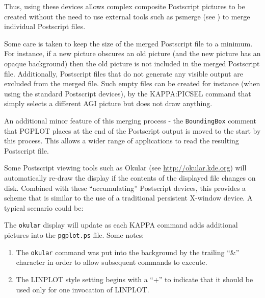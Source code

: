 \documentclass[twoside,11pt]{starlink}
\begin{document}
Thus, using these devices allows complex composite Postscript pictures to
be created without the need to use external tools such as psmerge (see
) to merge individual Postscript files.

Some care is taken to keep the size of the merged Postscript file to a
minimum. For instance, if a new picture obscures an old picture (and the
new picture has an opaque background) then the old picture is not
included in the merged Postscript file. Additionally, Postscript files
that do not generate any visible output are excluded from the merged
file. Such empty files can be created for instance (when using the
standard Postscript devices), by the KAPPA:PICSEL command that simply
selects a different AGI picture but does not draw anything.

An additional minor feature of this merging process - the \texttt{BoundingBox}
comment that PGPLOT places at the end of the Postscript output is moved
to the start by this process. This allows a wider range of applications
to read the resulting Postscript file.

Some Postscript viewing tools such as Okular (see \url{http://okular.kde.org}) will
automatically re-draw the display if the contents of the displayed file
changes on disk. Combined with these ``accumulating'' Postscript devices,
this provides a scheme that is similar to the use of a traditional
persistent X-window device. A typical scenario could be:

\begin{terminalv}
\end{terminalv}

The \texttt{okular} display will update as each KAPPA command adds additional
pictures into the \texttt{pgplot.ps} file. Some notes:

\begin{enumerate}
\item The \texttt{okular} command was put into the background by the trailing
``\&'' character in order to allow subsequent commands to execute.
\item The LINPLOT style setting begins with a ``+'' to indicate that it
should be used only for one invocation of LINPLOT.
\end{enumerate}
\end{document}
